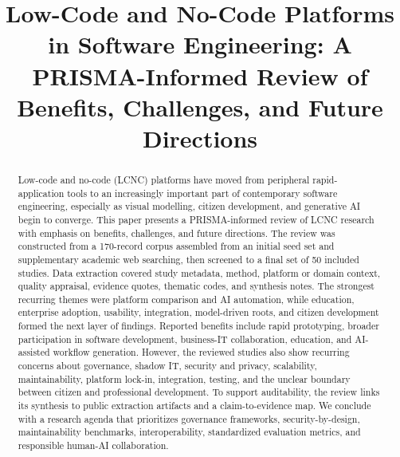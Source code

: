 \documentclass[conference]{IEEEtran}
\begin{document}
\title{Low-Code and No-Code Platforms in Software Engineering: A PRISMA-Informed Review of Benefits, Challenges, and Future Directions}

\author{
}


\maketitle

\begin{abstract}
Low-code and no-code (LCNC) platforms have moved from peripheral rapid-application tools to an increasingly important part of contemporary software engineering, especially as visual modelling, citizen development, and generative AI begin to converge. This paper presents a PRISMA-informed review of LCNC research with emphasis on benefits, challenges, and future directions. The review was constructed from a 170-record corpus assembled from an initial seed set and supplementary academic web searching, then screened to a final set of 50 included studies. Data extraction covered study metadata, method, platform or domain context, quality appraisal, evidence quotes, thematic codes, and synthesis notes. The strongest recurring themes were platform comparison and AI automation, while education, enterprise adoption, usability, integration, model-driven roots, and citizen development formed the next layer of findings. Reported benefits include rapid prototyping, broader participation in software development, business-IT collaboration, education, and AI-assisted workflow generation. However, the reviewed studies also show recurring concerns about governance, shadow IT, security and privacy, scalability, maintainability, platform lock-in, integration, testing, and the unclear boundary between citizen and professional development. To support auditability, the review links its synthesis to public extraction artifacts and a claim-to-evidence map. We conclude with a research agenda that prioritizes governance frameworks, security-by-design, maintainability benchmarks, interoperability, standardized evaluation metrics, and responsible human-AI collaboration.
\end{abstract}
\end{document}
